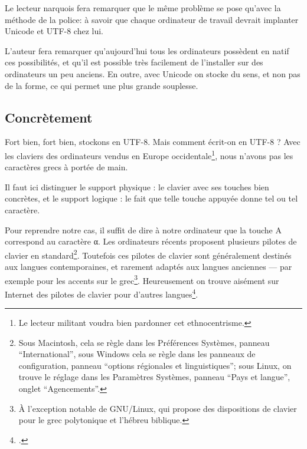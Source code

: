 \begin{plusloins}Le lecteur narquois fera remarquer que le même problème  se pose qu'avec la méthode de la police: à savoir que chaque ordinateur de travail devrait implanter Unicode et UTF-8 chez lui. 

L'auteur fera remarquer qu'aujourd'hui tous les ordinateurs possèdent en natif ces possibilités, et qu'il est possible très facilement de l'installer sur des ordinateurs un peu anciens. En outre, avec Unicode on stocke du sens, et non pas de la forme, ce qui permet une plus grande souplesse. 

\end{plusloins}

\subsection{Concrètement}

Fort bien, fort bien, stockons en UTF-8. Mais comment écrit-on en UTF-8 ? Avec les claviers des ordinateurs vendus en Europe occidentale\footnote{Le lecteur militant voudra bien pardonner cet ethnocentrisme.}, nous n'avons pas les caractères grecs à portée de main.

Il faut ici distinguer le support physique : le clavier avec ses touches bien concrètes, et le support logique : le fait que telle touche appuyée donne tel ou tel caractère. 

Pour reprendre notre cas, il suffit de dire à notre ordinateur que la touche A correspond au caractère α. Les ordinateurs récents proposent plusieurs pilotes de clavier en standard\footnote{Sous Macintosh, cela se règle dans les Préférences Systèmes, panneau \enquote{International}, sous Windows cela se règle dans les panneaux de configuration, panneau \enquote{options régionales et linguistiques}; sous Linux, on trouve le réglage dans les Paramètres Systèmes, panneau \enquote{Pays et langue}, onglet \enquote{Agencements}.}. Toutefois ces pilotes de clavier sont généralement destinés aux langues contemporaines, et rarement adaptés aux langues anciennes --- par exemple pour les accents sur le grec\footnote{À l'exception notable de GNU/Linux, qui propose des dispositions de clavier pour le grec polytonique et l'hébreu biblique.}. Heureusement on trouve aisément sur Internet des pilotes de clavier pour d'autres langues\footcites[Pour ce qui concerne le grec ancien, le syriaque, l'hébreu ancien, on pourra utiliser les claviers proposés par Michael Langlois:][]{clavierLanglois}[ou encore, pour le grec, les pilotes de l'École Normale Supérieure][]{clavierENS}.



